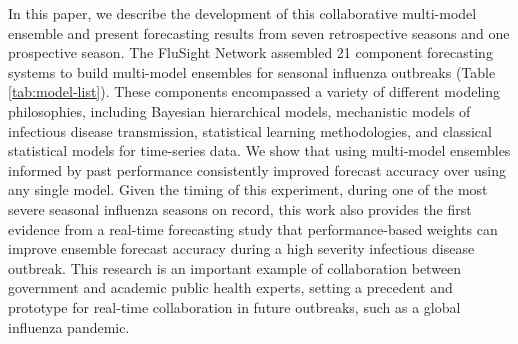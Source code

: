 \documentclass{article}\usepackage[]{graphicx}\usepackage[]{color}
\begin{document}
In this paper, we describe the development of this collaborative multi-model ensemble and present forecasting results from seven retrospective seasons and one prospective season.
The FluSight Network assembled 21 component forecasting systems to build multi-model ensembles for seasonal influenza outbreaks (Table \ref{tab:model-list}).
These components encompassed a variety of different modeling philosophies, including Bayesian hierarchical models, mechanistic models of infectious disease transmission, statistical learning methodologies, and classical statistical models for time-series data.
We show that using multi-model ensembles informed by past performance consistently improved forecast accuracy over using any single model.
Given the timing of this experiment, during one of the most severe seasonal influenza seasons on record, this work also provides the first evidence from a real-time forecasting study that performance-based weights can improve ensemble forecast accuracy during a high severity infectious disease outbreak. 
This research is an important example of collaboration between government and academic public health experts, setting a precedent and prototype for real-time collaboration in future outbreaks, such as a global influenza pandemic.
\end{document}
